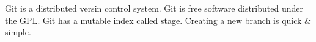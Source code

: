 ﻿Git is a distributed  versin control system.
Git is free software distributed under the GPL.
Git has a mutable index called stage.
Creating a new branch is quick & simple.